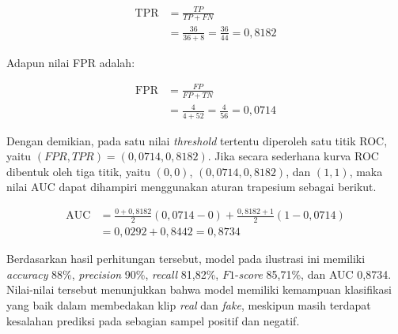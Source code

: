 \begin{align*}
\text{TPR} &= \frac{TP}{TP + FN} \\
&= \frac{36}{36 + 8} = \frac{36}{44} = 0{,}8182
\end{align*}
\par

Adapun nilai FPR adalah: \par

\begin{align*}
\text{FPR} &= \frac{FP}{FP + TN} \\
&= \frac{4}{4 + 52} = \frac{4}{56} = 0{,}0714
\end{align*}
\par

Dengan demikian, pada satu nilai \textit{threshold} tertentu diperoleh satu titik ROC, yaitu $(FPR, TPR) = (0{,}0714, 0{,}8182)$. Jika secara sederhana kurva ROC dibentuk oleh tiga titik, yaitu $(0,0)$, $(0{,}0714, 0{,}8182)$, dan $(1,1)$, maka nilai AUC dapat dihampiri menggunakan aturan trapesium sebagai berikut. \par

\begin{align*}
\text{AUC} &= \frac{0 + 0{,}8182}{2}(0{,}0714 - 0) + \frac{0{,}8182 + 1}{2}(1 - 0{,}0714) \\
&= 0{,}0292 + 0{,}8442 = 0{,}8734
\end{align*}
\par
\endgroup

Berdasarkan hasil perhitungan tersebut, model pada ilustrasi ini memiliki \textit{accuracy} 88\%, \textit{precision} 90\%, \textit{recall} 81{,}82\%, $F1$-\textit{score} 85{,}71\%, dan AUC 0{,}8734. Nilai-nilai tersebut menunjukkan bahwa model memiliki kemampuan klasifikasi yang baik dalam membedakan klip \textit{real} dan \textit{fake}, meskipun masih terdapat kesalahan prediksi pada sebagian sampel positif dan negatif. \par


